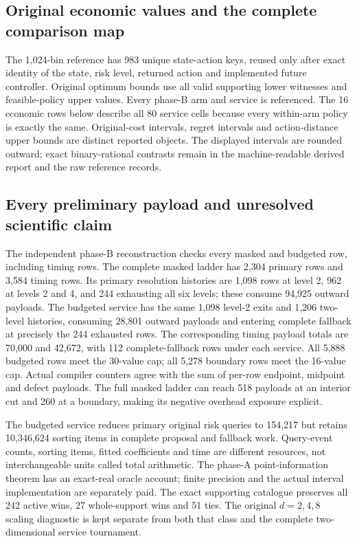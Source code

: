 \subsection{Original economic values and the complete comparison map}
The 1,024-bin reference has 983 unique state-action keys, reused only
after exact identity of the state, risk level, returned action and
implemented future controller.  Original optimum bounds use all valid
supporting lower witnesses and feasible-policy upper values.  Every
phase-B arm and service is referenced.  The 16 economic rows below
describe all 80 service cells because every within-arm policy is exactly
the same.  Original-cost intervals, regret intervals and action-distance
upper bounds are distinct reported objects.  The displayed intervals
are rounded outward; exact binary-rational contrasts remain in the
machine-readable derived report and the raw reference records.





\subsection{Every preliminary payload and unresolved scientific claim}
The independent phase-B reconstruction checks every masked and budgeted
row, including timing rows.  The complete masked ladder has 2,304 primary
rows and 3,584 timing rows.  Its primary resolution histories are 1,098
rows at level 2, 962 at levels 2 and 4, and 244 exhausting all six
levels; these consume 94,925 outward payloads.  The budgeted service has
the same 1,098 level-2 exits and 1,206 two-level histories, consuming
28,801 outward payloads and entering complete fallback at precisely the
244 exhausted rows.  The corresponding timing payload totals are 70,000
and 42,672, with 112 complete-fallback rows under each service.  All
5,888 budgeted rows meet the 30-value cap; all 5,278 boundary rows meet
the 16-value cap.  Actual compiler counters agree with the sum of
per-row endpoint, midpoint and defect payloads.  The full masked ladder
can reach 518 payloads at an interior cut and 260 at a boundary, making
its negative overhead exposure explicit.

The budgeted service reduces primary original risk queries to 154,217
but retains 10,346,624 sorting items in complete proposal and fallback
work.  Query-event counts, sorting items, fitted coefficients and time
are different resources, not interchangeable units called total
arithmetic.  The phase-A point-information theorem has an exact-real
oracle account; finite precision and the actual interval implementation
are separately paid.  The exact supporting catalogue preserves all
242 active wins, 27 whole-support wins and 51 ties.  The original
$d=2,4,8$ scaling diagnostic is kept separate from both that class and
the complete two-dimensional service tournament.

